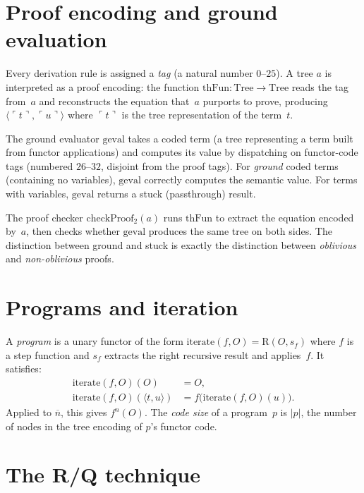 \documentclass[11pt]{article}
\newcommand{\pair}[2]{\langle #1, #2 \rangle}
\newcommand{\embed}{\ulcorner}
\newcommand{\embedr}{\urcorner}
\newcommand{\code}[1]{\embed #1 \embedr}
\newcommand{\geval}{\mathrm{geval}}
\newcommand{\thFun}{\mathrm{thFun}}
\newcommand{\nat}[1]{\overline{#1}}
\begin{document}
\section{Proof encoding and ground evaluation}

Every derivation rule is assigned a \emph{tag} (a natural number
$0$--$25$).  A tree $a$ is interpreted as a proof encoding:
the function $\thFun : \mathrm{Tree} \to \mathrm{Tree}$ reads the
tag from~$a$ and reconstructs the equation that~$a$ purports to
prove, producing $\pair{\code{t}}{\code{u}}$ where $\code{t}$
is the tree representation of the term~$t$.

The ground evaluator $\geval$ takes a coded term (a tree representing
a term built from functor applications) and computes its value by
dispatching on functor-code tags (numbered $26$--$32$,
disjoint from the proof tags).  For \emph{ground} coded terms
(containing no variables), $\geval$ correctly computes the semantic
value.  For terms with variables, $\geval$ returns a stuck
(passthrough) result.

The proof checker $\mathrm{checkProof}_2(a)$ runs $\thFun$ to extract
the equation encoded by~$a$, then checks whether $\geval$ produces
the same tree on both sides.  The distinction between ground and
stuck is exactly the distinction between \emph{oblivious} and
\emph{non-oblivious} proofs.

\section{Programs and iteration}

A \emph{program} is a unary functor of the form
$\mathrm{iterate}(f, O) = \mathrm{R}(O, s_f)$
where $f$ is a step function and $s_f$ extracts the right recursive
result and applies~$f$.  It satisfies:
\begin{align*}
  \mathrm{iterate}(f, O)(O) &= O, \\
  \mathrm{iterate}(f, O)(\pair{t}{u}) &= f\bigl(\mathrm{iterate}(f, O)(u)\bigr).
\end{align*}
Applied to $\nat{n}$, this gives $f^n(O)$.
The \emph{code size} of a program~$p$ is $|p|$, the number of
nodes in the tree encoding of $p$'s functor code.

\section{The R/Q technique}
\end{document}
